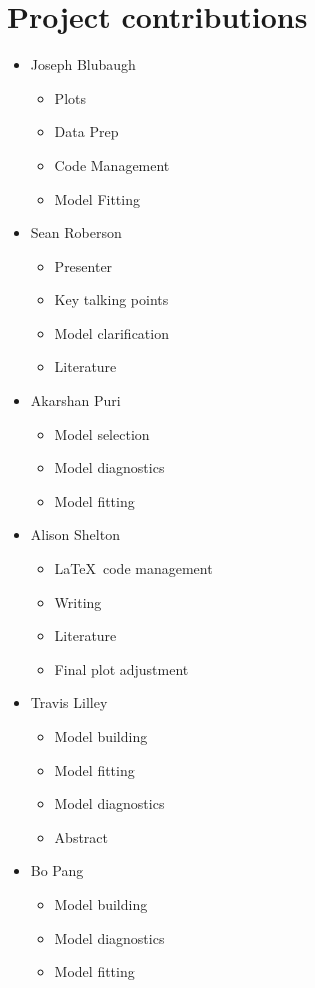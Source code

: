 \documentclass[twoside,twocolumn]{article}
\begin{document}
 \section*{Project contributions}
 \begin{itemize}
 	\item Joseph Blubaugh
 		\begin{itemize}
 			\item Plots
 			\item Data Prep
 			\item Code Management
 			\item Model Fitting
 		\end{itemize}

 	\item Sean Roberson
 	 		\begin{itemize}
 			\item Presenter
 			\item Key talking points
 			\item Model clarification
 			\item Literature
 		\end{itemize}

	\item Akarshan Puri
			\begin{itemize}
 			\item Model selection
 			\item Model diagnostics
 			\item Model fitting
 		\end{itemize}

 	\item Alison Shelton
 			\begin{itemize}
 				\item \LaTeX \ code management
 				\item Writing
 				\item Literature
 				\item Final plot adjustment
 			\end{itemize}

	\item Travis Lilley
			 \begin{itemize}
			 \item Model building
			 \item Model fitting
			 \item Model diagnostics
			 \item Abstract
			 \end{itemize}

	\item{Bo Pang}
		\begin{itemize}
					\item Model building
		 			\item Model diagnostics
		 			\item Model fitting
		\end{itemize}
 \end{itemize}
\end{document}
